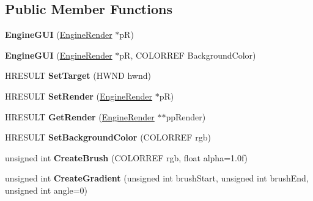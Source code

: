 \subsection*{Public Member Functions}
\begin{DoxyCompactItemize}
\item 
\hypertarget{class_engine_g_u_i_adc0b7c5dcd7d4908aa2635cd6cf3c34f}{{\bfseries Engine\-G\-U\-I} (\hyperlink{class_engine_render}{Engine\-Render} $\ast$p\-R)}\label{class_engine_g_u_i_adc0b7c5dcd7d4908aa2635cd6cf3c34f}

\item 
\hypertarget{class_engine_g_u_i_aee68cba4eaa919df34766ac7868c1628}{{\bfseries Engine\-G\-U\-I} (\hyperlink{class_engine_render}{Engine\-Render} $\ast$p\-R, C\-O\-L\-O\-R\-R\-E\-F Background\-Color)}\label{class_engine_g_u_i_aee68cba4eaa919df34766ac7868c1628}

\item 
\hypertarget{class_engine_g_u_i_a3cbd4d4884317ba0d487d0b62d608ea9}{H\-R\-E\-S\-U\-L\-T {\bfseries Set\-Target} (H\-W\-N\-D hwnd)}\label{class_engine_g_u_i_a3cbd4d4884317ba0d487d0b62d608ea9}

\item 
\hypertarget{class_engine_g_u_i_aab6ce1cb30b93531f043b6ab16d1a77d}{H\-R\-E\-S\-U\-L\-T {\bfseries Set\-Render} (\hyperlink{class_engine_render}{Engine\-Render} $\ast$p\-R)}\label{class_engine_g_u_i_aab6ce1cb30b93531f043b6ab16d1a77d}

\item 
\hypertarget{class_engine_g_u_i_a0a50472d2e0852021f43cc3e7f323eab}{H\-R\-E\-S\-U\-L\-T {\bfseries Get\-Render} (\hyperlink{class_engine_render}{Engine\-Render} $\ast$$\ast$pp\-Render)}\label{class_engine_g_u_i_a0a50472d2e0852021f43cc3e7f323eab}

\item 
\hypertarget{class_engine_g_u_i_a568e73147bf0d0028862a5f5e322194b}{H\-R\-E\-S\-U\-L\-T {\bfseries Set\-Background\-Color} (C\-O\-L\-O\-R\-R\-E\-F rgb)}\label{class_engine_g_u_i_a568e73147bf0d0028862a5f5e322194b}

\item 
\hypertarget{class_engine_g_u_i_a91068b676bd6a30f309a8a57b1331efa}{unsigned int {\bfseries Create\-Brush} (C\-O\-L\-O\-R\-R\-E\-F rgb, float alpha=1.\-0f)}\label{class_engine_g_u_i_a91068b676bd6a30f309a8a57b1331efa}

\item 
\hypertarget{class_engine_g_u_i_a3a02a0f511e625781b9a9d647f2edcdb}{unsigned int {\bfseries Create\-Gradient} (unsigned int brush\-Start, unsigned int brush\-End, unsigned int angle=0)}\label{class_engine_g_u_i_a3a02a0f511e625781b9a9d647f2edcdb}


\end{DoxyCompactItemize}
